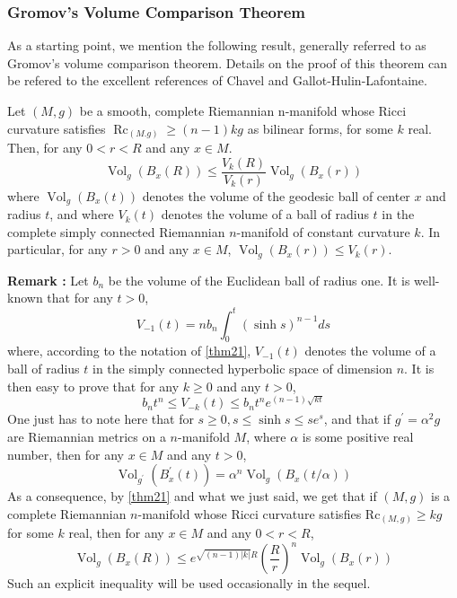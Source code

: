 \documentclass[12pt,hyperref,a4paper,UTF8]{ctexart}
\begin{document}
\subsubsection{Gromov's Volume Comparison Theorem}
As a starting point, we mention the following result, generally referred to as Gromov's volume comparison theorem. 
Details on the proof of this theorem can be refered to the excellent references of Chavel\cite{Chavel} and Gallot-Hulin-Lafontaine\cite{Gallot}.

\begin{Theorem}
    Let $(M, g)$ be a smooth, complete Riemannian n-manifold whose Ricci curvature satisfies $\operatorname{Rc}_{(M . g)} \geq(n-1) k g$ as bilinear forms, for some $k$ real. Then, for any $0<r<R$ and any $x \in M$.
    $$
    \operatorname{Vol}_g\left(B_{x}(R)\right) \leq \frac{V_k(R)}{V_k(r)} \operatorname{Vol}_g\left(B_x(r)\right)
    $$
    where $\operatorname{Vol}_g\left(B_x(t)\right)$ denotes the volume of the geodesic ball of center $x$ and radius $t$, and where $V_k(t)$ denotes the volume of a ball of radius $t$ in the complete simply connected Riemannian $n$-manifold of constant curvature $k$. In particular, for any $r>0$ and any $x \in M$, $\operatorname{Vol}_g\left(B_x(r)\right) \leq V_k(r)$.
    \label{thm21}
\end{Theorem}

\noindent
\textbf{Remark :} Let $b_n$ be the volume of the Euclidean ball of radius one. It is well-known that for any $t>0$,
$$
V_{-1}(t)=n b_n \int_0^t(\sinh s)^{n-1} d s
$$
where, according to the notation of \autoref{thm21}, $ V_{-1}(t)$ denotes the volume of a ball of radius $t$ in the simply connected hyperbolic space of dimension $n$. It is then easy to prove that for any $k \geq 0$ and any $t>0$,
$$
b_n t^n \leq V_{-k}(t) \leq b_n t^n e^{(n-1) \sqrt{k t}}
$$
One just has to note here that for $s \geq 0, s \leq \sinh s \leq s e^s$, and that if $g^{\prime}=\alpha^2 g$ are Riemannian metrics on a $n$-manifold $M$, where $\alpha$ is some positive real number,
then for any $x \in M$ and any $t>0$,
$$
\operatorname{Vol}_{g^{\prime}}\left(B_x^{\prime}(t)\right)=\alpha^n \operatorname{Vol}_g\left(B_x(t / \alpha)\right)
$$
As a consequence, by \autoref{thm21} and what we just said, we get that if $(M, g)$ is a complete Riemannian $n$-manifold whose Ricci curvature satisfies $\mathrm{R c}_{(M, g)} \geq k g$ for some $k$ real, then for any $x \in M$ and any $0<r<R$,
$$
\operatorname{Vol}_g\left(B_x(R)\right) \leq e^{\sqrt{(n-1)|k|} R}\left(\frac{R}{r}\right)^n \operatorname{Vol}_g\left(B_x(r)\right)
$$
Such an explicit inequality will be used occasionally in the sequel.
\end{document}
